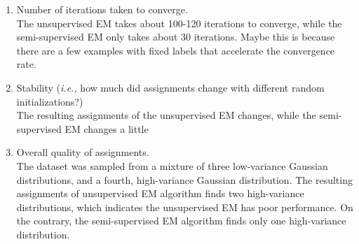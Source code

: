 \begin{answer}
\begin{enumerate}[label=\roman*.]
    \item Number of iterations taken to converge.\\
    The unsupervised EM takes about 100-120 iterations to converge, while the semi-supervised EM only takes about 30 iterations. Maybe this is because there are a few examples with fixed labels that accelerate the convergence rate.
    \item Stability (\emph{i.e.,} how much did assignments change with different random initializations?)\\
    The resulting assignments of the unsupervised EM changes, while the semi-supervised EM changes a little
    \item Overall quality of assignments.\\
    The dataset was sampled from a mixture of three low-variance Gaussian distributions, and a fourth, high-variance Gaussian distribution. The resulting assignments of unsupervised EM algorithm finds two high-variance distributions, which indicates the unsupervised EM has poor performance. On the contrary, the semi-supervised EM algorithm finds only one high-variance distribution. 
\end{enumerate}
\end{answer}
